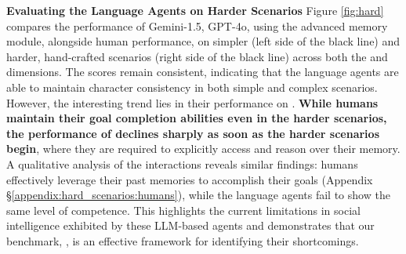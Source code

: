 \textbf{Evaluating the Language Agents on Harder Scenarios} \quad Figure \ref{fig:hard} compares the performance of Gemini-1.5, GPT-4o,  using the advanced memory module, alongside human performance, on simpler (left side of the black line) and harder, hand-crafted scenarios (right side of the black line) across both the \believability and \goalcompletion dimensions. The \believability scores remain consistent, indicating that the language agents are able to maintain character consistency in both simple and complex scenarios. However, the interesting trend lies in their performance on \goalcompletion. \textbf{While humans maintain their goal completion abilities even in the harder scenarios, the performance of  declines sharply as soon as the harder scenarios begin}, where they are required to explicitly access and reason over their memory. A qualitative analysis of the interactions reveals similar findings: humans effectively leverage their past memories to accomplish their goals (Appendix \S \ref{appendix:hard_scenarios:humans}), while the language agents fail to show the same level of competence. This highlights the current limitations in social intelligence exhibited by these LLM-based agents and demonstrates that our benchmark, \lifelongsotopia, is an effective framework for identifying their shortcomings.

